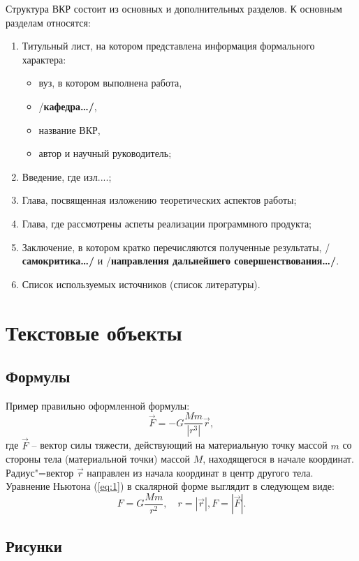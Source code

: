 \documentclass[a4paper,14pt,final]{extreport}
\newcommand{\aaa}[1]{{/\bfseries #1\ldots/}}
\begin{document}
Структура ВКР состоит из основных и дополнительных разделов.  К основным разделам относятся:
\begin{enumerate}
\item Титульный лист, на котором представлена информация формального характера:
  \begin{itemize}
  \item вуз, в котором выполнена работа,
  \item \aaa{кафедра},
  \item название ВКР,
  \item автор и научный руководитель;
  \end{itemize}
\item Введение, где изл....;
\item Глава, посвященная изложению теоретических аспектов работы;
\item Глава, где рассмотрены аспеты реализации программного продукта;
\item Заключение, в котором кратко перечисляются полученные результаты, \aaa{самокритика} и \aaa{направления дальнейшего совершенствования}.
\item Список используемых источников (список литературы).
\end{enumerate}

\section{Текстовые объекты}
\label{sec:objs}

\subsection{Формулы}
\label{sec:formulae}

Пример правильно оформленной формулы:
\begin{equation}
  \label{eq:1}
  \vec{F} = -G\frac{Mm}{|r^3|}\vec{r},
\end{equation}
где $\vec{F}$ -- вектор силы тяжести, действующий на материальную точку массой $m$ со стороны тела (материальной точки) массой $M$, находящегося в начале координат.  Радиус"=вектор $\vec{r}$ направлен из начала координат в центр другого тела.  Уравнение Ньютона (\ref{eq:1}) в скалярной форме выглядит в следующем виде:
\begin{equation*}
  F=G\frac{Mm}{r^2},\quad r=|\vec{r}|, F=|\vec{F}|.
\end{equation*}

\subsection{Рисунки}
\label{sec:figures}
\end{document}
